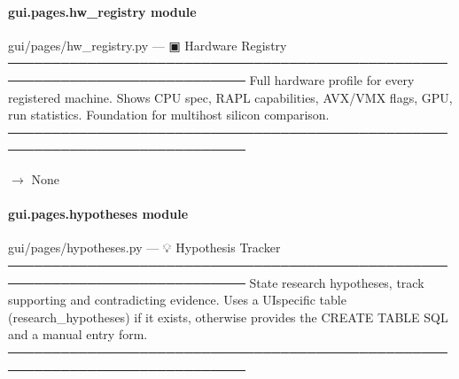 \documentclass[letterpaper,10pt,english]{sphinxmanual}
\begin{document}
\begin{fulllineitems}
\label{\detokenize{gui.pages.explorer:gui.pages.explorer.render}}
\pysigstartsignatures
\pysiglinewithargsret
{}
{}
{}
\pysigstopsignatures
\end{fulllineitems}


\sphinxstepscope


\paragraph{gui.pages.hw\_registry module}
\label{\detokenize{gui.pages.hw_registry:module-gui.pages.hw_registry}}\label{\detokenize{gui.pages.hw_registry:gui-pages-hw-registry-module}}\label{\detokenize{gui.pages.hw_registry::doc}}
\sphinxAtStartPar
gui/pages/hw\_registry.py  —  ▣  Hardware Registry
─────────────────────────────────────────────────────────────────────────────
Full hardware profile for every registered machine.
Shows CPU spec, RAPL capabilities, AVX/VMX flags, GPU, run statistics.
Foundation for multi\sphinxhyphen{}host silicon comparison.
─────────────────────────────────────────────────────────────────────────────

\begin{fulllineitems}
\label{\detokenize{gui.pages.hw_registry:gui.pages.hw_registry.render}}
\pysigstartsignatures
\pysiglinewithargsret
{}
{}
{{ $\rightarrow$ None}}
\pysigstopsignatures
\end{fulllineitems}


\sphinxstepscope


\paragraph{gui.pages.hypotheses module}
\label{\detokenize{gui.pages.hypotheses:module-gui.pages.hypotheses}}\label{\detokenize{gui.pages.hypotheses:gui-pages-hypotheses-module}}\label{\detokenize{gui.pages.hypotheses::doc}}
\sphinxAtStartPar
gui/pages/hypotheses.py  —  💡  Hypothesis Tracker
─────────────────────────────────────────────────────────────────────────────
State research hypotheses, track supporting and contradicting evidence.
Uses a UI\sphinxhyphen{}specific table (research\_hypotheses) if it exists,
otherwise provides the CREATE TABLE SQL and a manual entry form.
─────────────────────────────────────────────────────────────────────────────
\end{document}
